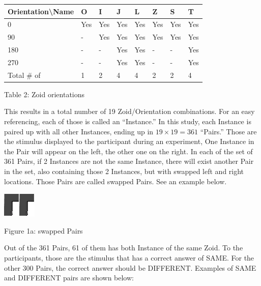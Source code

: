 \documentclass{article}
\begin{document}
	\begin{tabular}{|p{0.9in}|p{0.5in}|p{0.5in}|p{0.5in}|p{0.5in}|p{0.5in}|p{0.5in}|p{0.5in}|} \hline 
		Orientation{\textbackslash}Name & O & I & J & L & Z & S & T \\ \hline 
		0 & Yes & Yes & Yes & Yes & Yes & Yes & Yes \\ \hline 
		90 & - & Yes & Yes & Yes & Yes & Yes & Yes \\ \hline 
		180 & - & - & Yes & Yes & - & - & Yes \\ \hline 
		270 & - & - & Yes & Yes & - & - & Yes \\ \hline 
		Total \# of  & 1 & 2 & 4 & 4 & 2 & 2 & 4 \\ \hline 
	\end{tabular}
	
	Table 2: Zoid orientations
	
	\noindent This results in a total number of 19 Zoid/Orientation combinations. For an easy referencing, each of those is called an ``Instance.'' In this study, each Instance is paired up with all other Instances, ending up in $19\times 19=361$ ``Pairs.'' Those are the stimulus displayed to the participant during an experiment, One Instance in the Pair will appear on the left, the other one on the right. In each of the set of 361 Pairs, if 2 Instances are not the same Instance, there will exist another Pair in the set, also containing those 2 Instances, but with swapped left and right locations. Those Pairs are called swapped Pairs. See an example below.
	
	\noindent \includegraphics*[width=0.31in, height=0.47in, keepaspectratio=false]{image6}\includegraphics*[width=0.31in, height=0.47in, keepaspectratio=false]{image7}
	
	\noindent 
	
	\noindent Figure 1a: swapped Pairs
	
	\noindent Out of the 361 Pairs, 61 of them has both Instance of the same Zoid. To the participants, those are the stimulus that has a correct answer of SAME. For the other 300 Pairs, the correct answer should be DIFFERENT. Examples of SAME and DIFFERENT pairs are shown below:
	
\end{document}
